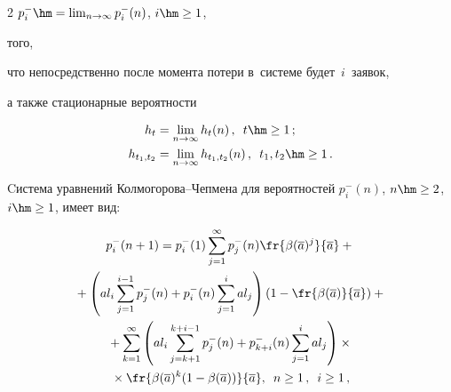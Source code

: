 \begin{multicols}{2}
$p_i^-\hm=\lim\nolimits_{n \rightarrow \infty } p_i^-(n)$, $i\hm\ge 1$, 


того,


что непосредственно после момента потери в~системе будет~$i$~заявок,


а также стационарные вероятности


\begin{align*}


h_{t}&=\lim\limits_{n \rightarrow \infty } h_{t}(n)\,,\enskip t \hm\ge 1\,;\\


h_{t_1,t_2}&=\lim\limits_{n \rightarrow \infty } h_{t_1,t_2}(n)\,,\enskip 


t_1,t_2 \hm\ge 1\,.


\end{align*}





Cистема уравнений Колмогорова--Чепмена для вероятностей $p_i^-(n)$, $n 


\hm\ge 2$, $i \hm\ge 1$, имеет вид:


\begin{multline}


p_i^-(n+1)=p_i^-(1)\sum\limits_{j=1}^\infty


p_j^-(n) \fr{\beta(\overline{a})^j}{\overline{a}}+{}\\


{}+\left(al_i \sum\limits_{j=1}^{i-1}


p_j^-(n) +p_i^-(n)\sum\limits_{j=1}^{i}al_j\right)


\left( 1-\fr{\beta(\overline{a}) }{\overline{a}}\right)+{}


\\


{}+


\sum\limits_{k=1}^\infty


\left(


al_i \sum\limits_{j=k+1}^{k+i-1}


p_j^-(n) +


p_{k+i}^-(n) \sum\limits_{j=1}^{i}


al_j \right)\times{}\\


{}\times


\fr{\beta(\overline{a})^k (1-\beta(\overline{a})) }{\overline{a}}, 


\enskip n \ge 1\,, \enskip i \ge 1\,,


\label{loss1}



\end{multline}
\end{multicols}
